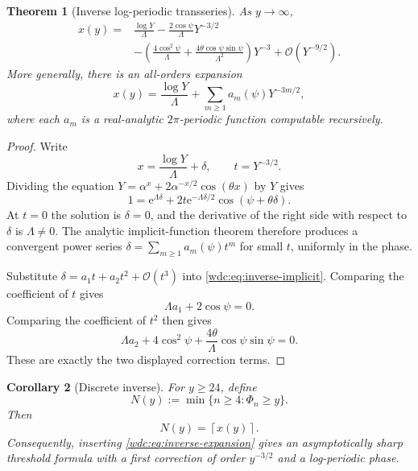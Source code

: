 \documentclass[11pt,letterpaper]{article}
\numberwithin{equation}{section}
\newtheorem{theorem}{Theorem}[section]
\newtheorem{corollary}[theorem]{Corollary}
\theoremstyle{definition}
\newcommand{\bigO}{\mathcal O}
\newcommand{\e}{\mathrm e}
\newcommand{\ceil}[1]{\left\lceil#1\right\rceil}
\begin{document}
\begin{theorem}[Inverse log-periodic transseries]\label{wdc:thm:inverse}
As $y\to\infty$,
\begin{align}
 x(y)={}&\frac{\log Y}{\Lambda}
 -\frac{2\cos\psi}{\Lambda}Y^{-3/2}\nonumber\\
 &-\left(
   \frac{4\cos^2\psi}{\Lambda}
   +\frac{4\theta\cos\psi\sin\psi}{\Lambda^2}
   \right)Y^{-3}
 +\bigO(Y^{-9/2}).\label{wdc:eq:inverse-expansion}
\end{align}
More generally, there is an all-orders expansion
\begin{equation}\label{wdc:eq:inverse-all-orders}
 x(y)=\frac{\log Y}{\Lambda}
      +\sum_{m\ge1}a_m(\psi)Y^{-3m/2},
\end{equation}
where each $a_m$ is a real-analytic $2\pi$-periodic function computable
recursively.
\end{theorem}

\begin{proof}
Write
\[
  x=\frac{\log Y}{\Lambda}+\delta,
  \qquad t=Y^{-3/2}.
\]
Dividing the equation $Y=\alpha^x+2\alpha^{-x/2}\cos(\theta x)$ by $Y$ gives
\begin{equation}\label{wdc:eq:inverse-implicit}
  1=\e^{\Lambda\delta}
    +2t\e^{-\Lambda\delta/2}\cos(\psi+\theta\delta).
\end{equation}
At $t=0$ the solution is $\delta=0$, and the derivative of the right side
with respect to $\delta$ is $\Lambda\ne0$.  The analytic implicit-function theorem
therefore produces a convergent power series
$\delta=\sum_{m\ge1}a_m(\psi)t^m$ for small $t$, uniformly in the phase.

Substitute $\delta=a_1t+a_2t^2+\bigO(t^3)$ into
\eqref{wdc:eq:inverse-implicit}.  Comparing the coefficient of $t$ gives
\[
  \Lambda a_1+2\cos\psi=0.
\]
Comparing the coefficient of $t^2$ then gives
\[
  \Lambda a_2+4\cos^2\psi
  +\frac{4\theta}{\Lambda}\cos\psi\sin\psi=0.
\]
These are exactly the two displayed correction terms.
\end{proof}

\begin{corollary}[Discrete inverse]\label{wdc:cor:discrete-inverse}
For $y\ge24$, define
\[
 N(y):=\min\{n\ge4:\Phi_n\ge y\}.
\]
Then
\begin{equation}\label{wdc:eq:discrete-inverse}
  \boxed{N(y)=\ceil{x(y)}.}
\end{equation}
Consequently, inserting \eqref{wdc:eq:inverse-expansion} gives an asymptotically
sharp threshold formula with a first correction of order $y^{-3/2}$ and a
log-periodic phase.
\end{corollary}
\end{document}
